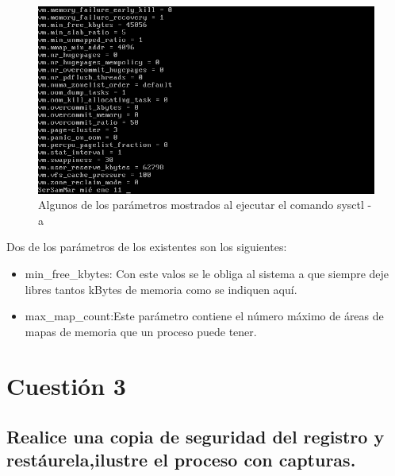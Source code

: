 \begin{figure}[H] %
	\centering
	\includegraphics[scale=0.5]{imagenes/sys-a.png}  %
	\caption{Algunos de los parámetros mostrados al ejecutar el comando sysctl -a } \label{fig:figura5}
\end{figure}

Dos de los parámetros de los existentes son los siguientes: 
\begin{itemize}
	\item min\_free\_kbytes: Con este valos se le obliga al sistema a que siempre deje libres tantos kBytes de memoria como se indiquen aquí. \cite{parametros}
	
	\item max\_map\_count:Este parámetro contiene el número máximo de áreas de mapas de memoria que un proceso puede tener. \cite{parametros}
\end{itemize}



\section{Cuestión 3}

\subsection{\Large Realice una copia de seguridad del registro y restáurela,ilustre el proceso con capturas. }

